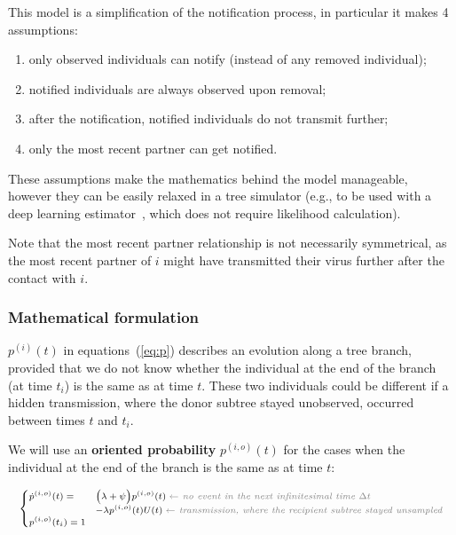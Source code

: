 \documentclass[a4paper,10pt]{article}
\begin{document}
This model is a simplification of the notification process, in particular it makes 4 assumptions:
\begin{enumerate}
\item only observed individuals can notify (instead of any removed individual);
\item notified individuals are always observed upon removal;
\item after the notification, notified individuals do not transmit further;
\item only the most recent partner can get notified.
\end{enumerate}

These assumptions make the mathematics behind the model manageable, however they can be easily relaxed in a tree simulator (e.g., to be used with a deep learning estimator~\citep{Voznica2021}, which does not require likelihood calculation).

Note that the most recent partner relationship is not necessarily symmetrical, as the most recent partner of $i$ might have transmitted their virus further after the contact with $i$. 

\subsubsection{Mathematical formulation}
$p^{(i)}(t)$ in equations~(\ref{eq:p}) describes an evolution along a tree branch, provided that we do not know whether the individual at the end of the branch (at time $t_i$) is the same as at time $t$. These two individuals could be different if a hidden transmission, where the donor subtree stayed unobserved, occurred between times $t$ and $t_i$.

We will use an \textbf{oriented probability} $p^{(i,o)}(t)$ for the cases when the individual at the end of the branch is the same as at time $t$:

\begin{equation}
\scriptsize
\begin{cases}
\dot{p}^{(i,o)}(t) = & \Big(\lambda + \psi\Big) p^{(i,o)}(t)\; \textit{\color{gray} $\leftarrow$ no event in the next infinitesimal time $\Delta t$ }\\
    & - \lambda p^{(i,o)}(t)U(t)\;  \textit{\color{gray} $\leftarrow$ transmission, where the recipient subtree stayed unsampled}\\
p^{(i,o)}(t_i) = 1\label{eq:p-o}
\end{cases}
\end{equation}
\end{document}
